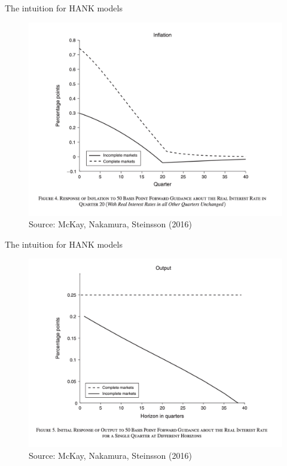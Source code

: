 \documentclass[english,xcolor=svgnames]{beamer}
\begin{document}
\begin{frame}{The intuition for HANK models}
\begin{figure}
\includegraphics[scale=0.35]{figures/mns_2}\\
Source: McKay, Nakamura, Steinsson (2016)
\end{figure}
\end{frame}



\begin{frame}{The intuition for HANK models}
\begin{figure}
\includegraphics[scale=0.35]{figures/mns_4}\\
Source: McKay, Nakamura, Steinsson (2016)
\end{figure}
\end{frame}
\end{document}
